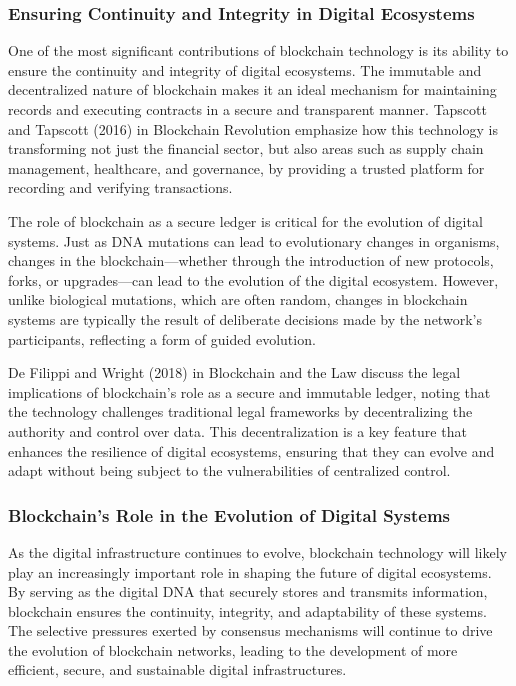 \documentclass[12pt,twoside]{article}
\begin{document}
\subsubsection{Ensuring Continuity and Integrity in Digital Ecosystems}

One of the most significant contributions of blockchain technology is its ability to ensure the continuity and integrity of digital ecosystems. The immutable and decentralized nature of blockchain makes it an ideal mechanism for maintaining records and executing contracts in a secure and transparent manner. Tapscott and Tapscott (2016) in Blockchain Revolution emphasize how this technology is transforming not just the financial sector, but also areas such as supply chain management, healthcare, and governance, by providing a trusted platform for recording and verifying transactions.

The role of blockchain as a secure ledger is critical for the evolution of digital systems. Just as DNA mutations can lead to evolutionary changes in organisms, changes in the blockchain—whether through the introduction of new protocols, forks, or upgrades—can lead to the evolution of the digital ecosystem. However, unlike biological mutations, which are often random, changes in blockchain systems are typically the result of deliberate decisions made by the network’s participants, reflecting a form of guided evolution.

De Filippi and Wright (2018) in Blockchain and the Law discuss the legal implications of blockchain’s role as a secure and immutable ledger, noting that the technology challenges traditional legal frameworks by decentralizing the authority and control over data. This decentralization is a key feature that enhances the resilience of digital ecosystems, ensuring that they can evolve and adapt without being subject to the vulnerabilities of centralized control.

\subsubsection{Blockchain’s Role in the Evolution of Digital Systems}

As the digital infrastructure continues to evolve, blockchain technology will likely play an increasingly important role in shaping the future of digital ecosystems. By serving as the digital DNA that securely stores and transmits information, blockchain ensures the continuity, integrity, and adaptability of these systems. The selective pressures exerted by consensus mechanisms will continue to drive the evolution of blockchain networks, leading to the development of more efficient, secure, and sustainable digital infrastructures.
\end{document}
